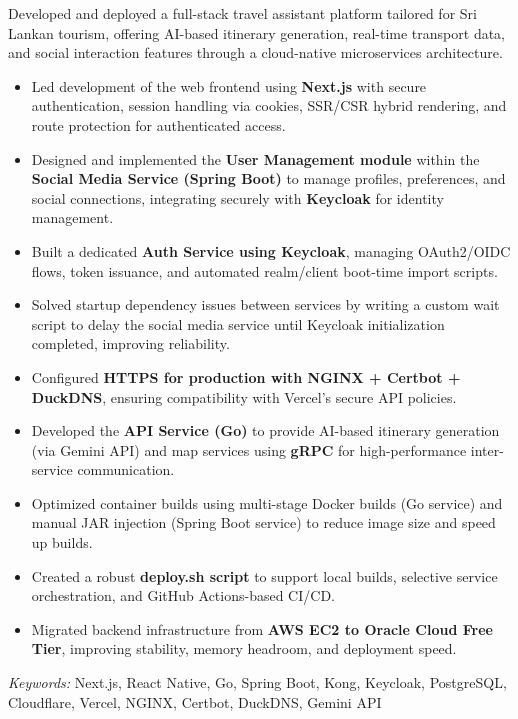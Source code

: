 \nointent 
{}
 
\nointent 
Developed and deployed a full-stack travel assistant platform tailored for Sri Lankan tourism, offering AI-based itinerary generation, real-time transport data, and social interaction features through a cloud-native microservices architecture. 
 
\begin{itemize} 
    \item Led development of the web frontend using \textbf{Next.js} with secure authentication, session handling via cookies, SSR/CSR hybrid rendering, and route protection for authenticated access. 
    \item Designed and implemented the \textbf{User Management module} within the \textbf{Social Media Service (Spring Boot)} to manage profiles, preferences, and social connections, integrating securely with \textbf{Keycloak} for identity management. 
    \item Built a dedicated \textbf{Auth Service using Keycloak}, managing OAuth2/OIDC flows, token issuance, and automated realm/client boot-time import scripts. 
    \item Solved startup dependency issues between services by writing a custom wait script to delay the social media service until Keycloak initialization completed, improving reliability. 
    \item Configured \textbf{HTTPS for production with NGINX + Certbot + DuckDNS}, ensuring compatibility with Vercel’s secure API policies. 
    \item Developed the \textbf{API Service (Go)} to provide AI-based itinerary generation (via Gemini API) and map services using \textbf{gRPC} for high-performance inter-service communication. 
    \item Optimized container builds using multi-stage Docker builds (Go service) and manual JAR injection (Spring Boot service) to reduce image size and speed up builds. 
    \item Created a robust \textbf{deploy.sh script} to support local builds, selective service orchestration, and GitHub Actions-based CI/CD. 
    \item Migrated backend infrastructure from \textbf{AWS EC2 to Oracle Cloud Free Tier}, improving stability, memory headroom, and deployment speed. 
\end{itemize} 
 
\nointent 
\textit{Keywords:} Next.js, React Native, Go, Spring Boot, Kong, Keycloak, PostgreSQL, Cloudflare, Vercel, NGINX, Certbot, DuckDNS, Gemini API 
 
\vspace{1em} 
